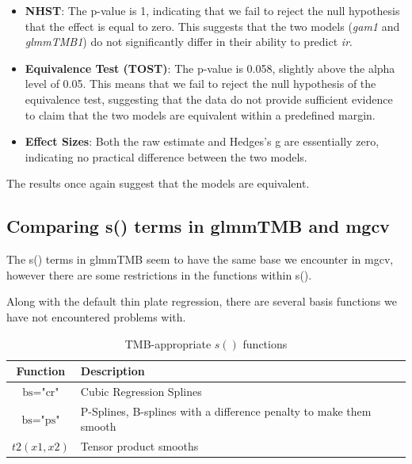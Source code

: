 \begin{itemize}
    \item \textbf{NHST}: The p-value is 1, indicating that we fail to reject the null hypothesis that the effect is equal to zero. This suggests that the two models (\textit{gam1} and \textit{glmmTMB1}) do not significantly differ in their ability to predict \textit{ir}.
    
    \item \textbf{Equivalence Test (TOST)}: The p-value is 0.058, slightly above the alpha level of 0.05. This means that we fail to reject the null hypothesis of the equivalence test, suggesting that the data do not provide sufficient evidence to claim that the two models are equivalent within a predefined margin.
    
    \item \textbf{Effect Sizes}: Both the raw estimate and Hedges's g are essentially zero, indicating no practical difference between the two models.
\end{itemize}

The results once again suggest that the models are equivalent. 


\subsection{Comparing s() terms in glmmTMB and mgcv}
The s() terms in glmmTMB seem to have the same base we encounter in mgcv, however there are some restrictions in the functions within s().

Along with the default thin plate regression, there are several basis functions we have not encountered problems with.


\begin{table}[h]
    \centering
    \caption{TMB-appropriate \( s() \) functions}
    \label{tab:TMB-functions}
    \begin{tabularx}{\textwidth}{|c|X|}
        \hline
        Function & Description \\
        \hline 
        \( \text{bs} = \text{"cr"} \) & Cubic Regression Splines \\
        \hline 
        \( \text{bs} = \text{"ps"} \) & P-Splines, B-splines with a difference penalty to make them smooth  \\
        \hline
        \( t2(x1,x2) \) & Tensor product smooths \\
        \hline
    \end{tabularx}
\end{table}

